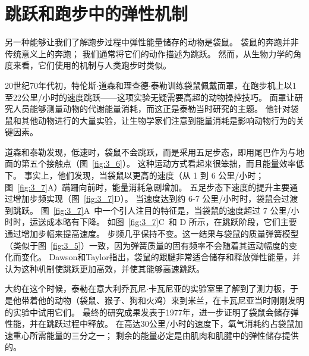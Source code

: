 \section{跳跃和跑步中的弹性机制}

另一种能够让我们了解跑步过程中弹性能量储存的动物是袋鼠。
袋鼠的奔跑并非传统意义上的奔跑；
我们通常将它们的动作描述为跳跃。
然而，从生物力学的角度来看，它们使用的机制与人类跑步时类似。


20世纪70年代初，特伦斯$\cdot$道森和理查德$\cdot$泰勒训练袋鼠佩戴面罩，在跑步机上以1至22公里/小时的速度跳跃——这项实验无疑需要高超的动物操控技巧。
面罩让研究人员能够测量动物的代谢能量消耗，而这正是泰勒当时研究的主题。
他针对袋鼠和其他​​动物进行的大量实验，让生物学家们注意到能量消耗是影响动物行为的关键因素。


道森和泰勒发现，低速时，袋鼠不会跳跃，而是采用五足步态，即用尾巴作为与地面的第五个接触点（图~\ref{fig:3_6}）。
这种运动方式看起来很笨拙，而且能量效率低下。
事实上，他们发现，当袋鼠以更高的速度（从 1 到 6 公里/小时；图~\ref{fig:3_7}A）蹒跚向前时，能量消耗急剧增加。
五足步态下速度的提升主要通过增加步频实现（图~\ref{fig:3_7}D）。
当速度达到约 6-7 公里/小时时，袋鼠会过渡到跳跃。
图~\ref{fig:3_7}A~中一个引人注目的特征是，当袋鼠的速度超过 7 公里/小时时，运送成本略有下降。
如图~\ref{fig:3_7}C~和 D 所示，在跳跃阶段，它们主要通过增加步幅来提高速度。
步频几乎保持不变。这一结果与袋鼠的质量弹簧模型（类似于图~\ref{fig:3_5}）一致，因为弹簧质量的固有频率不会随着其运动幅度的变化而变化。
Dawson和Taylor指出，袋鼠的跟腱非常适合储存和释放弹性能量，并认为这种机制使跳跃更加高效，并使其能够高速跳跃。


大约在这个时候，泰勒在意大利乔瓦尼$\cdot$卡瓦尼亚的实验室里了解到了测力板，于是他带着他的动物（袋鼠、猴子、狗和火鸡）来到米兰，在卡瓦尼亚当时刚刚发明的实验中试用它们。
最终的研究成果发表于1977年，进一步证明了袋鼠会储存弹性能，并在跳跃过程中释放。
在高达30公里/小时的速度下，氧气消耗约占袋鼠加速重心所需能量的三分之一；
剩余的能量必定是由肌肉和肌腱中的弹性储存提供的。


